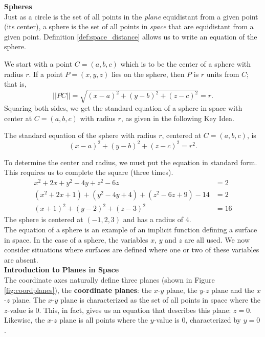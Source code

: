 \noindent\textbf{\large Spheres}\\

Just as a circle is the set of all points in the \textit{plane} equidistant from a given point (its center), a sphere is the set of all points in \textit{space} that are equidistant from a given point. Definition \ref{def:space_distance} allows us to write an equation of the sphere.

We start with a point $C = (a,b,c)$ which is to be the center of a sphere with radius $r$. If a point $P=(x,y,z)$ lies on the sphere, then $P$ is $r$ units from $C$; that is, 
$$||\overline{PC}|| = \sqrt{(x-a)^2+(y-b)^2+(z-c)^2} = r.$$
Squaring both sides, we get the standard equation of a sphere in space with center at $C=(a,b,c)$ with radius $r$, as given in the following Key Idea.

{The standard equation of the sphere with radius $r$, centered at $C=(a,b,c)$, is
$$(x-a)^2+(y-b)^2+(z-c)^2=r^2.$$
}

{To determine the center and radius, we must put the equation in standard form. This requires us to complete the square (three times).
\begin{align*}
x^2+2x+y^2-4y+z^2-6z&=2 \\
(x^2+2x+1) + (y^2-4y+4)+ (z^2-6z+9) - 14 &= 2\\
(x+1)^2 + (y-2)^2 + (z-3)^2 &= 16
\end{align*}
The sphere is centered at $(-1,2,3)$ and has a radius of 4.
}\\

The equation of a sphere is an example of an implicit function defining a surface in space. In the case of a sphere, the variables $x$, $y$ and $z$ are all used. We now consider situations where surfaces are defined where one or two of these variables are absent.\\

\noindent\textbf{\large Introduction to Planes in Space}\\

The coordinate axes naturally define three planes (shown in Figure \ref{fig:coordplanes}), the \textbf{coordinate planes}: the $x$-$y$ plane, the $y$-$z$ plane and the $x$-$z$ plane. The $x$-$y$ plane is characterized as the set of all points in space where the $z$-value is 0. %
This, in fact, gives us an equation that describes this plane: $z=0$. Likewise, the $x$-$z$ plane is all points where the $y$-value is 0, characterized by $y=0$.\\

